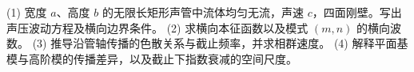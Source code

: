 (1) 宽度 \(a\)、高度 \(b\) 的无限长矩形声管中流体均匀无流，声速 \(c\)，四面刚壁。写出声压波动方程及横向边界条件。
(2) 求横向本征函数以及模式 \((m,n)\) 的横向波数。
(3) 推导沿管轴传播的色散关系与截止频率，并求相群速度。
(4) 解释平面基模与高阶模的传播差异，以及截止下指数衰减的空间尺度。
